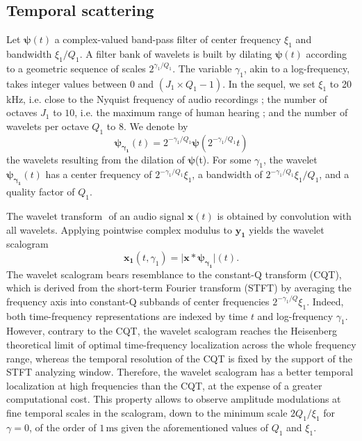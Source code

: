 \documentclass[journal]{IEEEtran}
\makeatletter
\newcommand*{\ie}{i.e.\@\xspace}
\makeatother
\begin{document}
\subsection{Temporal scattering}
Let $\boldsymbol{\psi}(t)$ a complex-valued band-pass filter of
center frequency $\xi_1$ and bandwidth $\xi_1/Q_1$.
A filter bank of wavelets is built by dilating $\boldsymbol{\psi}(t)$
according to a geometric sequence of scales $2^{\gamma_1/Q_1}$.
The variable $\gamma_1$, akin to a log-frequency, takes integer values between $0$ and $(J_1 \times Q_1 - 1)$.
In the sequel, we set $\xi_1$ to 20 kHz, \ie close to the Nyquist frequency of audio recordings ; the number of octaves $J_1$ to $10$, \ie the maximum range of human hearing ; and the number of wavelets per octave $Q_1$ to $8$.
We denote by
\begin{equation}
\boldsymbol{\psi_{\gamma_1}}(t) = 2^{-\gamma_1/Q_1} \boldsymbol{\psi}(2^{-\gamma_1/Q_1} t)
\end{equation}
the wavelets resulting from the dilation of $\boldsymbol{\psi}$(t).
For some $\gamma_1$, the wavelet $\boldsymbol{\psi_{\gamma_1}}(t)$
has a center frequency of $2^{-\gamma_1/Q_1}\xi_1$, a bandwidth of $2^{-\gamma_1/Q_1}\xi_1/Q_1$, and a quality factor of $Q_1$.

The wavelet transform $\boldsymbol{}$ of an audio signal
$\boldsymbol{x}(t)$ is obtained by convolution with all wavelets.
Applying pointwise complex modulus to $\boldsymbol{y_1}$ yields
the wavelet scalogram
\begin{equation}
\boldsymbol{x_1}(t, \gamma_1)
= \vert \boldsymbol{x} \ast \boldsymbol{\psi_{\gamma_1}} \vert (t).
\end{equation}
The wavelet scalogram bears resemblance to the constant-Q transform (CQT),
which is derived from the short-term Fourier transform (STFT) by averaging the frequency
axis into constant-Q subbands of center frequencies $2^{-\gamma_1/Q}\xi_1$.
Indeed, both time-frequency representations are indexed by time $t$ and log-frequency $\gamma_1$.
However, contrary to the CQT, the wavelet scalogram reaches the Heisenberg
theoretical limit of optimal time-frequency localization across the whole
frequency range, whereas the temporal resolution of the CQT is fixed by the support of the STFT analyzing window.
Therefore, the wavelet scalogram has a better temporal localization at high
frequencies than the CQT, at the expense of a greater computational cost.
This property allows to observe amplitude modulations at fine temporal scales in the scalogram, down to the minimum scale $2Q_1/\xi_1$ for $\gamma = 0$, of the order of $1\,\textrm{ms}$ given the aforementioned values of $Q_1$ and $\xi_1$.
\end{document}
